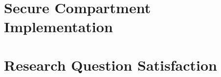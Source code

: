 
\section{Secure Compartment Implementation}

\label{Ch7 Sec2}


\section{Research Question Satisfaction}

\label{Ch7 Sec3}

